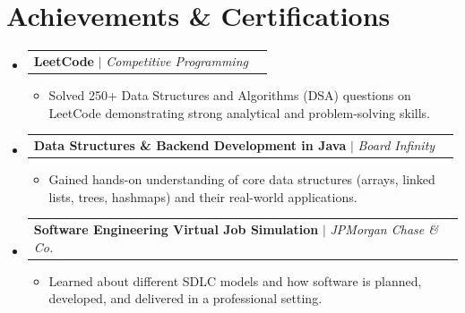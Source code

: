\documentclass[letterpaper,11pt]{article}
\makeatletter
\newcommand{\resumeItem}[1]{
  \item\normalsize{
    {#1 \vspace{-2pt}}
  }
}
\newcommand{\resumeProjectHeading}[2]{
    \item
    \begin{tabular*}{0.97\textwidth}{l@{\extracolsep{\fill}}r}
      \small#1 & #2 \\
    \end{tabular*}
}
\newcommand{\resumeItemListStart}{\begin{itemize}[leftmargin=0.15in, itemsep=3pt, topsep=3pt, parsep=0pt, partopsep=0pt]}
\newcommand{\resumeItemListEnd}{\end{itemize}}
\makeatother
\begin{document}
\section{Achievements \& Certifications}
  \begin{itemize}[leftmargin=0.15in, label={}, itemsep=5pt, topsep=2pt, parsep=0pt, partopsep=0pt]
    \resumeProjectHeading
      {\textbf{LeetCode} $|$ \emph{Competitive Programming}}{}
      \resumeItemListStart
        \resumeItem{Solved 250+ Data Structures and Algorithms (DSA) questions on LeetCode demonstrating strong analytical and problem-solving skills.}
      \resumeItemListEnd
      
    \resumeProjectHeading
      {\textbf{Data Structures \& Backend Development in Java} $|$ \emph{Board Infinity}}{}
      \resumeItemListStart
        \resumeItem{Gained hands-on understanding of core data structures (arrays, linked lists, trees, hashmaps) and their real-world applications.}
      \resumeItemListEnd
      
    \resumeProjectHeading
      {\textbf{Software Engineering Virtual Job Simulation} $|$ \emph{JPMorgan Chase \& Co.}}{}
      \resumeItemListStart
        \resumeItem{Learned about different SDLC models and how software is planned, developed, and delivered in a professional setting.}
      \resumeItemListEnd
  \end{itemize}

\end{document}
